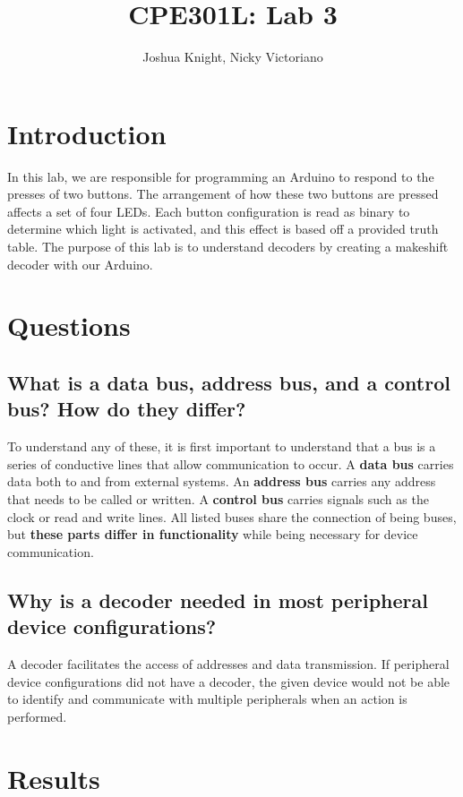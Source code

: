 \documentclass{article}
\title{CPE301L: Lab 3}
\author{Joshua Knight, Nicky Victoriano}
\begin{document}
\maketitle

\section{Introduction}

In this lab, we are responsible for programming an Arduino to respond to the presses of two buttons. The arrangement of how these two buttons are pressed affects a set of four LEDs. Each button configuration is read as binary to determine which light is activated, and this effect is based off a provided truth table. The purpose of this lab is to understand decoders by creating a makeshift decoder with our Arduino.

\section{Questions}

\subsection{What is a data bus, address bus, and a control bus? How do they differ?}

To understand any of these, it is first important to understand that a bus is a series of conductive lines that allow communication to occur. A \textbf{data bus} carries data both to and from external systems. An \textbf{address bus} carries any address that needs to be called or written. A \textbf{control bus} carries signals such as the clock or read and write lines. All listed buses share the connection of being buses, but \textbf{ these parts differ in functionality} while being necessary for device communication.

\subsection{Why is a decoder needed in most peripheral device configurations?}

A decoder facilitates the access of addresses and data transmission. If peripheral device configurations did not have a decoder, the given device would not be able to identify and communicate with multiple peripherals when an action is performed.

\section{Results}
\end{document}
